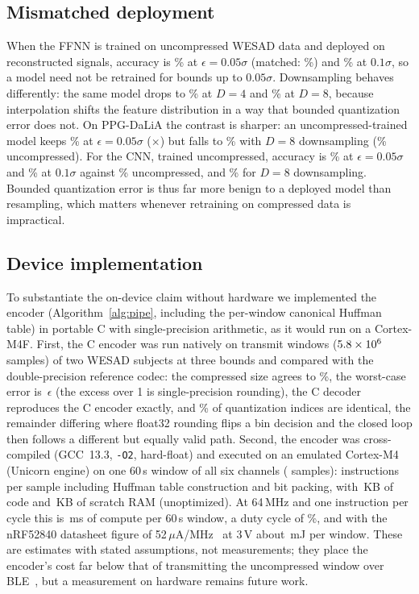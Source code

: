 \documentclass[journal,twoside,web]{ieeecolor}
\begin{document}
\subsection{Mismatched deployment}
When the FFNN is trained on uncompressed WESAD data and deployed on reconstructed signals, accuracy is \accMMEd\% at $\epsilon=0.05\sigma$ (matched: \accEd\%) and \accMMEe\% at $0.1\sigma$, so a model need not be retrained for bounds up to $0.05\sigma$. Downsampling behaves differently: the same model drops to \dsAccMMC\% at $D=4$ and \dsAccMME\% at $D=8$, because interpolation shifts the feature distribution in a way that bounded quantization error does not. On PPG-DaLiA the contrast is sharper: an uncompressed-trained model keeps \daliaAccMMEd\% at $\epsilon=0.05\sigma$ (\daliaRatioEd$\times$) but falls to \daliaDsAccMMH\% with $D=8$ downsampling (\daliaRawAcc\% uncompressed). For the CNN, trained uncompressed, accuracy is \cnnAccMMEd\% at $\epsilon=0.05\sigma$ and \cnnAccMMEe\% at $0.1\sigma$ against \cnnRawAcc\% uncompressed, and \cnnDsAccMMH\% for $D=8$ downsampling. Bounded quantization error is thus far more benign to a deployed model than resampling, which matters whenever retraining on compressed data is impractical.

\subsection{Device implementation}
To substantiate the on-device claim without hardware we implemented the encoder (Algorithm~\ref{alg:pipe}, including the per-window canonical Huffman table) in portable C with single-precision arithmetic, as it would run on a Cortex-M4F. First, the C encoder was run natively on \fwTestWindows{} transmit windows ($5.8\times10^{6}$ samples) of two WESAD subjects at three bounds and compared with the double-precision reference codec: the compressed size agrees to \fwBitsRelDiff\%, the worst-case error is \fwMaxErr\,$\epsilon$ (the excess over 1 is single-precision rounding), the C decoder reproduces the C encoder exactly, and \fwIdentical\% of quantization indices are identical, the remainder differing where float32 rounding flips a bin decision and the closed loop then follows a different but equally valid path. Second, the encoder was cross-compiled (GCC~13.3, \texttt{-O2}, hard-float) and executed on an emulated Cortex-M4 (Unicorn engine) on one 60\,s window of all six channels (\fwWindowSamples{} samples): \fwInstrPerSample{} instructions per sample including Huffman table construction and bit packing, with \fwCodeKB\,KB of code and \fwRamKB\,KB of scratch RAM (unoptimized). At 64\,MHz and one instruction per cycle this is \fwTimeMs\,ms of compute per 60\,s window, a duty cycle of \fwDuty\%, and with the nRF52840 datasheet figure of 52\,$\mu$A/MHz~\cite{nrf52840} at 3\,V about \fwEnergyMJ\,mJ per window. These are estimates with stated assumptions, not measurements; they place the encoder's cost far below that of transmitting the uncompressed window over BLE~\cite{siekkinen2012}, but a measurement on hardware remains future work.
\end{document}
